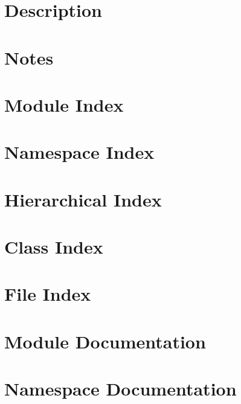 \let\mypdfximage\pdfximage\def\pdfximage{\immediate\mypdfximage}\documentclass[twoside]{book}
\newcommand{\+}{\discretionary{\mbox{\scriptsize$\hookleftarrow$}}{}{}}
\begin{document}
\chapter{Description}
\label{md__d_1__documentz__git_hub__z_e_n_z_o-_core_src_test_data__r_e_a_d_m_e}

\chapter{Notes}
\label{md__d_1__documentz__git_hub__z_e_n_z_o-_core_src_test__r_e_a_d_m_e}

\chapter{Module Index}

\chapter{Namespace Index}

\chapter{Hierarchical Index}

\chapter{Class Index}

\chapter{File Index}

\chapter{Module Documentation}


\chapter{Namespace Documentation}






\end{document}
